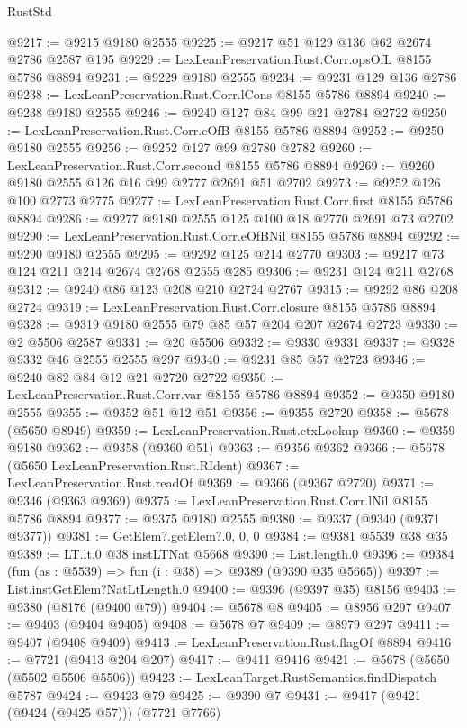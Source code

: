 \begin{lexlean}{RustStd}
\begin{coremodule}
@9217 := @9215 @9180 @2555
@9225 := @9217 @51 @129 @136 @62 @2674 @2786 @2587 @195
@9229 := LexLeanPreservation.Rust.Corr.opsOfL @8155 @5786 @8894
@9231 := @9229 @9180 @2555
@9234 := @9231 @129 @136 @2786
@9238 := LexLeanPreservation.Rust.Corr.lCons @8155 @5786 @8894
@9240 := @9238 @9180 @2555
@9246 := @9240 @127 @84 @99 @21 @2784 @2722
@9250 := LexLeanPreservation.Rust.Corr.eOfB @8155 @5786 @8894
@9252 := @9250 @9180 @2555
@9256 := @9252 @127 @99 @2780 @2782
@9260 := LexLeanPreservation.Rust.Corr.second @8155 @5786 @8894
@9269 := @9260 @9180 @2555 @126 @16 @99 @2777 @2691 @51 @2702
@9273 := @9252 @126 @100 @2773 @2775
@9277 := LexLeanPreservation.Rust.Corr.first @8155 @5786 @8894
@9286 := @9277 @9180 @2555 @125 @100 @18 @2770 @2691 @73 @2702
@9290 := LexLeanPreservation.Rust.Corr.eOfBNil @8155 @5786 @8894
@9292 := @9290 @9180 @2555
@9295 := @9292 @125 @214 @2770
@9303 := @9217 @73 @124 @211 @214 @2674 @2768 @2555 @285
@9306 := @9231 @124 @211 @2768
@9312 := @9240 @86 @123 @208 @210 @2724 @2767
@9315 := @9292 @86 @208 @2724
@9319 := LexLeanPreservation.Rust.Corr.closure @8155 @5786 @8894
@9328 := @9319 @9180 @2555 @79 @85 @57 @204 @207 @2674 @2723
@9330 := @2 @5506 @2587
@9331 := @20 @5506
@9332 := @9330 @9331
@9337 := @9328 @9332 @46 @2555 @2555 @297
@9340 := @9231 @85 @57 @2723
@9346 := @9240 @82 @84 @12 @21 @2720 @2722
@9350 := LexLeanPreservation.Rust.Corr.var @8155 @5786 @8894
@9352 := @9350 @9180 @2555
@9355 := @9352 @51 @12 @51
@9356 := @9355 @2720
@9358 := @5678 (@5650 @8949)
@9359 := LexLeanPreservation.Rust.ctxLookup
@9360 := @9359 @9180
@9362 := @9358 (@9360 @51)
@9363 := @9356 @9362
@9366 := @5678 (@5650 LexLeanPreservation.Rust.RIdent)
@9367 := LexLeanPreservation.Rust.readOf
@9369 := @9366 (@9367 @2720)
@9371 := @9346 (@9363 @9369)
@9375 := LexLeanPreservation.Rust.Corr.lNil @8155 @5786 @8894
@9377 := @9375 @9180 @2555
@9380 := @9337 (@9340 (@9371 @9377))
@9381 := GetElem?.getElem?.{0, 0, 0}
@9384 := @9381 @5539 @38 @35
@9389 := LT.lt.{0} @38 instLTNat @5668
@9390 := List.length.{0}
@9396 := @9384 (fun (as : @5539) => fun (i : @38) => @9389 (@9390 @35 @5665))
@9397 := List.instGetElem?NatLtLength.{0}
@9400 := @9396 (@9397 @35) @8156
@9403 := @9380 (@8176 (@9400 @79))
@9404 := @5678 @8
@9405 := @8956 @297
@9407 := @9403 (@9404 @9405)
@9408 := @5678 @7
@9409 := @8979 @297
@9411 := @9407 (@9408 @9409)
@9413 := LexLeanPreservation.Rust.flagOf @8894
@9416 := @7721 (@9413 @204 @207)
@9417 := @9411 @9416
@9421 := @5678 (@5650 (@5502 @5506 @5506))
@9423 := LexLeanTarget.RustSemantics.findDispatch @5787
@9424 := @9423 @79
@9425 := @9390 @7
@9431 := @9417 (@9421 (@9424 (@9425 @57))) (@7721 @7766)

\end{coremodule}
\end{lexlean}
